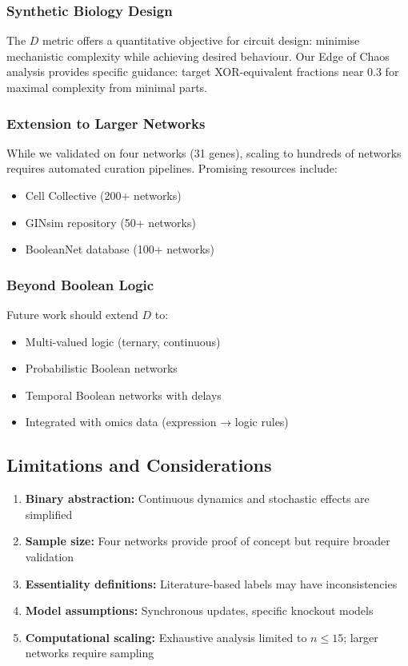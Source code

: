 \documentclass[12pt]{article}
\begin{document}
\subsubsection{Synthetic Biology Design}
The \(D\) metric offers a quantitative objective for circuit design: minimise mechanistic complexity while achieving desired behaviour. Our Edge of Chaos analysis provides specific guidance: target XOR-equivalent fractions near 0.3 for maximal complexity from minimal parts.

\subsubsection{Extension to Larger Networks}
While we validated on four networks (31 genes), scaling to hundreds of networks requires automated curation pipelines. Promising resources include:
\begin{itemize}
    \item Cell Collective (200+ networks) \cite{Helikar2013}
    \item GINsim repository (50+ networks) \cite{Chaouiya2012}
    \item BooleanNet database (100+ networks) \cite{Albert2008}
\end{itemize}

\subsubsection{Beyond Boolean Logic}
Future work should extend \(D\) to:
\begin{itemize}
    \item Multi-valued logic (ternary, continuous)
    \item Probabilistic Boolean networks
    \item Temporal Boolean networks with delays
    \item Integrated with omics data (expression → logic rules)
\end{itemize}

\subsection{Limitations and Considerations}

\begin{enumerate}
    \item \textbf{Binary abstraction:} Continuous dynamics and stochastic effects are simplified
    \item \textbf{Sample size:} Four networks provide proof of concept but require broader validation
    \item \textbf{Essentiality definitions:} Literature-based labels may have inconsistencies
    \item \textbf{Model assumptions:} Synchronous updates, specific knockout models
    \item \textbf{Computational scaling:} Exhaustive analysis limited to \(n \leq 15\); larger networks require sampling
\end{enumerate}
\end{document}
